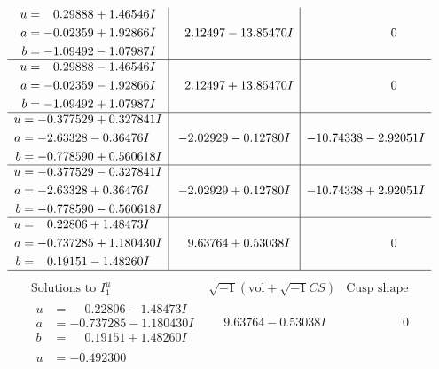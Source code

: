 \documentclass[1p]{elsarticle_modified}
\theoremstyle{definition}
\newcommand{\I}{\sqrt{-1}}
\begin{document}
$$\begin{array}{c|c|c}
\begin{aligned}
u &= \phantom{-}0.29888 + 1.46546 I \\
a &= -0.02359 + 1.92866 I \\
b &= -1.09492 - 1.07987 I\end{aligned}
 & \phantom{-}2.12497 - 13.85470 I & \phantom{-0.000000 } 0 \\ \hline\begin{aligned}
u &= \phantom{-}0.29888 - 1.46546 I \\
a &= -0.02359 - 1.92866 I \\
b &= -1.09492 + 1.07987 I\end{aligned}
 & \phantom{-}2.12497 + 13.85470 I & \phantom{-0.000000 } 0 \\ \hline\begin{aligned}
u &= -0.377529 + 0.327841 I \\
a &= -2.63328 - 0.36476 I \\
b &= -0.778590 + 0.560618 I\end{aligned}
 & -2.02929 - 0.12780 I & -10.74338 - 2.92051 I \\ \hline\begin{aligned}
u &= -0.377529 - 0.327841 I \\
a &= -2.63328 + 0.36476 I \\
b &= -0.778590 - 0.560618 I\end{aligned}
 & -2.02929 + 0.12780 I & -10.74338 + 2.92051 I \\ \hline\begin{aligned}
u &= \phantom{-}0.22806 + 1.48473 I \\
a &= -0.737285 + 1.180430 I \\
b &= \phantom{-}0.19151 - 1.48260 I\end{aligned}
 & \phantom{-}9.63764 + 0.53038 I & \phantom{-0.000000 } 0\\
 \hline 
 \end{array}$$\newpage$$\begin{array}{c|c|c}  
\text{Solutions to }I^u_{1}& \I (\text{vol} + \sqrt{-1}CS) & \text{Cusp shape}\\
 \hline 
\begin{aligned}
u &= \phantom{-}0.22806 - 1.48473 I \\
a &= -0.737285 - 1.180430 I \\
b &= \phantom{-}0.19151 + 1.48260 I\end{aligned}
 & \phantom{-}9.63764 - 0.53038 I & \phantom{-0.000000 } 0 \\ \hline\begin{aligned}
u &= -0.492300\phantom{ +0.000000I} \\

\end{aligned}
\end{array}$$
\end{document}
